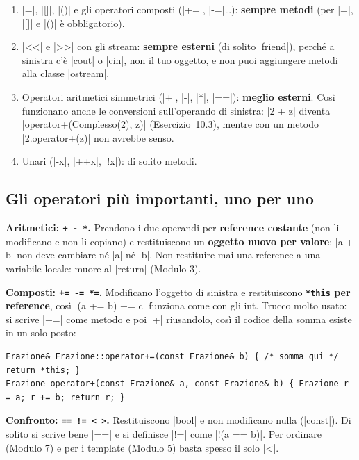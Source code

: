 \begin{passopasso}
\begin{enumerate}
  \item \cc|=|, \cc|[]|, \cc|()| e gli operatori composti (\cc|+=|, \cc|-=|\ldots):
        \textbf{sempre metodi} (per \cc|=|, \cc|[]| e \cc|()| è obbligatorio).
  \item \cc|<<| e \cc|>>| con gli stream: \textbf{sempre esterni} (di solito
        \cc|friend|), perché a sinistra c'è \cc|cout| o \cc|cin|, non il tuo oggetto, e
        non puoi aggiungere metodi alla classe \cc|ostream|.
  \item Operatori aritmetici simmetrici (\cc|+|, \cc|-|, \cc|*|, \cc|==|):
        \textbf{meglio esterni}. Così funzionano anche le conversioni sull'operando di
        sinistra: \cc|2 + z| diventa \cc|operator+(Complesso(2), z)| (Esercizio~10.3),
        mentre con un metodo \cc|2.operator+(z)| non avrebbe senso.
  \item Unari (\cc|-x|, \cc|++x|, \cc|!x|): di solito metodi.
\end{enumerate}
\end{passopasso}

\subsection*{Gli operatori più importanti, uno per uno}

\textbf{Aritmetici: \texttt{+ - *}.} Prendono i due operandi per \textbf{reference
costante} (non li modificano e non li copiano) e restituiscono un \textbf{oggetto nuovo
per valore}: \cc|a + b| non deve cambiare né \cc|a| né \cc|b|. Non restituire mai una
reference a una variabile locale: muore al \cc|return| (Modulo 3).

\textbf{Composti: \texttt{+= -= *=}.} Modificano l'oggetto di sinistra e restituiscono
\textbf{\texttt{*this} per reference}, così \cc|(a += b) += c| funziona come con gli int.
Trucco molto usato: si scrive \cc|+=| come metodo e poi \cc|+| riusandolo, così il
codice della somma esiste in un solo posto:
\begin{lstlisting}
Frazione& Frazione::operator+=(const Frazione& b) { /* somma qui */ return *this; }
Frazione operator+(const Frazione& a, const Frazione& b) { Frazione r = a; r += b; return r; }
\end{lstlisting}

\textbf{Confronto: \texttt{== != < >}.} Restituiscono \cc|bool| e non modificano nulla
(\cc|const|). Di solito si scrive bene \cc|==| e si definisce
\cc|!=| come \cc|!(a == b)|. Per ordinare (Modulo 7) e per i template (Modulo 5) basta
spesso il solo \cc|<|.

